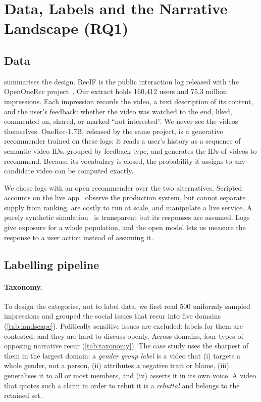 \section{Data, Labels and the Narrative Landscape (RQ1)}
\label{sec:data}




\subsection{Data}

 summarises the design. RecIF is the public interaction log released with the OpenOneRec project~\citep{zhou2025openonerec}. Our extract holds 160{,}412 users and 75.3 million impressions. Each impression records the video, a text description of its content, and the user's feedback: whether the video was watched to the end, liked, commented on, shared, or marked ``not interested''. We never see the videos themselves. OneRec-1.7B, released by the same project, is a generative recommender trained on these logs: it reads a user's history as a sequence of semantic video IDs, grouped by feedback type, and generates the IDs of videos to recommend. Because its vocabulary is closed, the probability it assigns to any candidate video can be computed exactly.

We chose logs with an open recommender over the two alternatives. Scripted accounts on the live app~\citep{haroon2023youtube,kaplan2026foryou} observe the production system, but cannot separate supply from ranking, are costly to run at scale, and manipulate a live service. A purely synthetic simulation~\citep{chaney2018confounding,jiang2019degenerate} is transparent but its responses are assumed. Logs give exposure for a whole population, and the open model lets us measure the response to a user action instead of assuming it.

\subsection{Labelling pipeline}

\paragraph{Taxonomy.} To design the categories, not to label data, we first read 500 uniformly sampled impressions and grouped the social issues that recur into five domains (\cref{tab:landscape}). Politically sensitive issues are excluded: labels for them are contested, and they are hard to discuss openly. Across domains, four types of opposing narrative recur (\cref{tab:taxonomy}). The case study uses the sharpest of them in the largest domain: a \emph{gender group label} is a video that (i) targets a whole gender, not a person, (ii) attributes a negative trait or blame, (iii) generalises it to all or most members, and (iv) asserts it in its own voice. A video that quotes such a claim in order to rebut it is a \emph{rebuttal} and belongs to the retained set.

